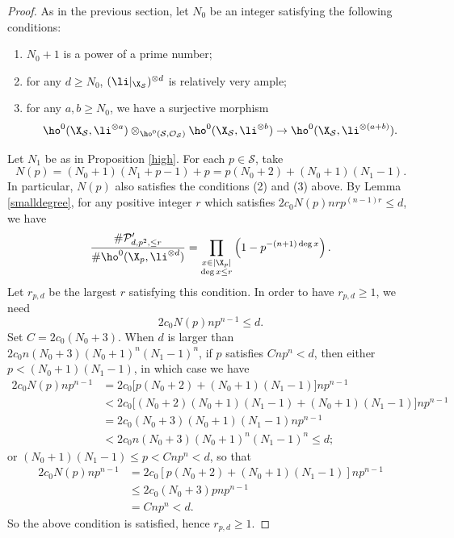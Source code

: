 \begin{proof}
As in the previous section, let $N_0$ be an integer satisfying the following conditions:
\begin{enumerate}
\item $N_0+1$ is a power of a prime number;
\item for any $d\geq N_0$, $(\li|_{\X_\mathcal{S}})^{\otimes d}$ is relatively very ample;
\item for any $a,b\geq N_0$, we have a surjective morphism
\[
\ho^0(\X_{\mathcal{S}}, \li^{\otimes a}) \otimes_{\ho^0(\mathcal{S}, \mathcal{O}_{\mathcal{S}})}\ho^0(\X_{\mathcal{S}}, \li^{\otimes b})\to \ho^0(\X_{\mathcal{S}}, \li^{\otimes (a+b)}).
\]
\end{enumerate}

Let $N_1$ be as in Proposition \ref{high}.
For each $p\in \mathcal{S}$, take
\[
N(p)=(N_0+1)(N_1+p-1)+p=p(N_0+2)+(N_0+1)(N_1-1).
\]
In particular, $N(p)$ also satisfies the conditions (2) and (3) above.
By Lemma \ref{smalldegree}, for any positive integer $r$ which satisfies $2c_0N(p)nrp^{(n-1)r}\leq d$, we have
\[
\frac{\#\mathcal{P}'_{d,p^2,\leq r}}{\#\ho^0(\X_{p}, \li^{\otimes d})}=\prod_{\substack{x\in |\X_{p}|\\ \deg x\leq r}} \left(1-p^{-(n+1)\deg x} \right).
\]
Let $r_{p,d}$ be the largest $r$ satisfying this condition. In order to have $r_{p,d}\geq 1$, we need
\[
2c_0N(p)np^{n-1}\leq d.
\]
Set $C=2c_0(N_0+3)$. When $d$ is larger than $2c_0n(N_0+3)(N_0+1)^n(N_1-1)^n$, if $p$ satisfies $Cnp^n<d$, then either $p<(N_0+1)(N_1-1)$, in which case we have
\begin{align*}
2c_0N(p)np^{n-1} &= 2c_0\Big[ p(N_0+2)+(N_0+1)(N_1-1)\Big]np^{n-1} \\
&<2c_0\Big[ (N_0+2)(N_0+1)(N_1-1)+(N_0+1)(N_1-1)\Big]np^{n-1}\\
&=2c_0(N_0+3)(N_0+1)(N_1-1)np^{n-1}\\
&<2c_0n(N_0+3)(N_0+1)^n(N_1-1)^n\leq d;
\end{align*}
or $(N_0+1)(N_1-1)\leq p <Cnp^n<d$, so that
\begin{align*}
2c_0N(p)np^{n-1}&= 2c_0[p(N_0+2)+(N_0+1)(N_1-1)]np^{n-1} \\
&\leq 2c_0(N_0+3)pnp^{n-1}\\
&=Cnp^n<d.
\end{align*}
So the above condition is satisfied, hence $r_{p,d}\geq 1$.


\end{proof}
